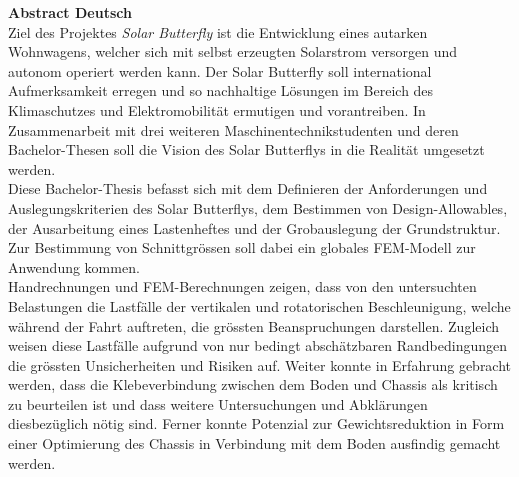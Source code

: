 \textbf{Abstract Deutsch}\\
Ziel des Projektes \emph{Solar Butterfly} ist die Entwicklung eines autarken Wohnwagens, welcher sich mit selbst erzeugten Solarstrom versorgen und autonom operiert werden kann. Der Solar Butterfly soll international Aufmerksamkeit erregen und so nachhaltige Lösungen im Bereich des Klimaschutzes und Elektromobilität ermutigen und vorantreiben. In Zusammenarbeit mit drei weiteren Maschinentechnikstudenten und deren Bachelor-Thesen soll die Vision des Solar Butterflys in die Realität umgesetzt werden.\\
Diese Bachelor-Thesis befasst sich mit dem Definieren der Anforderungen und Auslegungskriterien des Solar Butterflys, dem Bestimmen von Design-Allowables, der Ausarbeitung eines Lastenheftes und der Grobauslegung der Grundstruktur. Zur Bestimmung von Schnittgrössen soll dabei ein globales FEM-Modell zur Anwendung kommen.\\
Handrechnungen und FEM-Berechnungen zeigen, dass von den untersuchten Belastungen die Lastfälle der vertikalen und rotatorischen Beschleunigung, welche während der Fahrt auftreten, die grössten Beanspruchungen darstellen. Zugleich weisen diese Lastfälle aufgrund von nur bedingt abschätzbaren Randbedingungen die grössten Unsicherheiten und Risiken auf. Weiter konnte in Erfahrung gebracht werden, dass die Klebeverbindung zwischen dem Boden und Chassis als kritisch zu beurteilen ist und dass weitere Untersuchungen und Abklärungen diesbezüglich nötig sind.
Ferner konnte Potenzial zur Gewichtsreduktion in Form einer Optimierung des Chassis in Verbindung mit dem Boden ausfindig gemacht werden.


